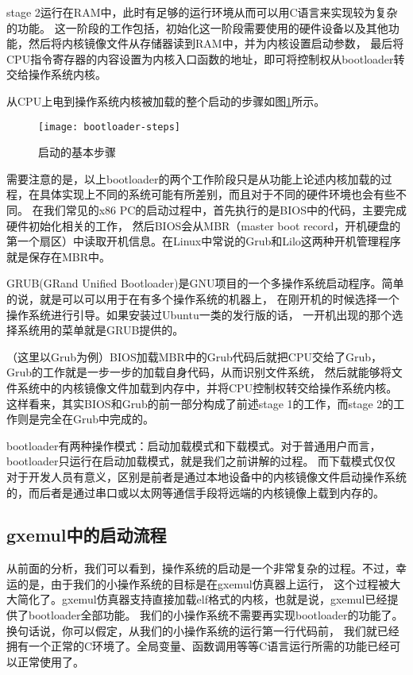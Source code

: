 stage 2运行在RAM中，此时有足够的运行环境从而可以用C语言来实现较为复杂的功能。
这一阶段的工作包括，初始化这一阶段需要使用的硬件设备以及其他功能，然后将内核镜像文件从存储器读到RAM中，并为内核设置启动参数，
最后将CPU指令寄存器的内容设置为内核入口函数的地址，即可将控制权从bootloader转交给操作系统内核。

从CPU上电到操作系统内核被加载的整个启动的步骤如图\ref{fig:bootloader-steps}所示。

\begin{figure}[htbp]
  \centering
  \texttt{[image: bootloader-steps]}
  \caption{启动的基本步骤}\label{fig:bootloader-steps} 
\end{figure}

需要注意的是，以上bootloader的两个工作阶段只是从功能上论述内核加载的过程，在具体实现上不同的系统可能有所差别，而且对于不同的硬件环境也会有些不同。
在我们常见的x86 PC的启动过程中，首先执行的是BIOS中的代码，主要完成硬件初始化相关的工作，
然后BIOS会从MBR（master boot record，开机硬盘的第一个扇区）中读取开机信息。在Linux中常说的Grub和Lilo这两种开机管理程序就是保存在MBR中。

\begin{note}
GRUB(GRand Unified Bootloader)是GNU项目的一个多操作系统启动程序。简单的说，就是可以可以用于在有多个操作系统的机器上，
在刚开机的时候选择一个操作系统进行引导。如果安装过Ubuntu一类的发行版的话， 一开机出现的那个选择系统用的菜单就是GRUB提供的。
\end{note}

（这里以Grub为例）BIOS加载MBR中的Grub代码后就把CPU交给了Grub，Grub的工作就是一步一步的加载自身代码，从而识别文件系统，
然后就能够将文件系统中的内核镜像文件加载到内存中，并将CPU控制权转交给操作系统内核。
这样看来，其实BIOS和Grub的前一部分构成了前述stage 1的工作，而stage 2的工作则是完全在Grub中完成的。

\begin{note}
bootloader有两种操作模式：启动加载模式和下载模式。对于普通用户而言，bootloader只运行在启动加载模式，就是我们之前讲解的过程。
而下载模式仅仅对于开发人员有意义，区别是前者是通过本地设备中的内核镜像文件启动操作系统的，而后者是通过串口或以太网等通信手段将远端的内核镜像上载到内存的。
\end{note}

\subsection{gxemul中的启动流程}
从前面的分析，我们可以看到，操作系统的启动是一个非常复杂的过程。不过，幸运的是，由于我们的小操作系统的目标是在gxemul仿真器上运行，
这个过程被大大简化了。gxemul仿真器支持直接加载elf格式的内核，也就是说，gxemul已经提供了bootloader全部功能。
我们的小操作系统不需要再实现bootloader的功能了。换句话说，你可以假定，从我们的小操作系统的运行第一行代码前，
我们就已经拥有一个正常的C环境了。全局变量、函数调用等等C语言运行所需的功能已经可以正常使用了。

